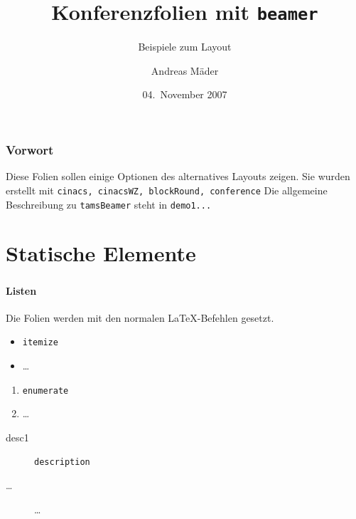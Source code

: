 \documentclass[t]{beamer}
\title[Konferenzfolien]			%
  {Konferenzfolien mit \texttt{beamer}}
\subtitle[Beispiele]			%
  {Beispiele zum Layout}
\author[A.~M\"ader]{Andreas M\"ader}
\date[04-nov-2007]			%
  {04.~November 2007}
\begin{document}
\frame{\titlepage}

\begin{frame}
  \frametitle{\tocName}
  \tableofcontents
\end{frame}

\begin{frame}
  \frametitle{Vorwort}
  Diese Folien sollen einige Optionen des alternatives Layouts zeigen.
  Sie wurden erstellt mit \alert{\texttt{cinacs, cinacsWZ, blockRound,
	conference}}\mnewlin
  Die allgemeine Beschreibung zu \texttt{tamsBeamer} steht in \texttt{demo1...}
\end{frame}


\section{Statische Elemente}

\begin{frame}
  \frametitle{\insertsection}
  \framesubtitle{Listen}
  Die Folien werden mit den normalen \LaTeX{}-Befehlen gesetzt.

  \begin{itemize}
  \item \texttt{itemize}
  \item \ldots
  \end{itemize}

  \begin{enumerate}
  \item \texttt{enumerate}
  \item \ldots
  \end{enumerate}

  \begin{description}
  \item[desc1] \texttt{description}
  \item[\ldots] \ldots
  \end{description}
\end{frame}
\end{document}
